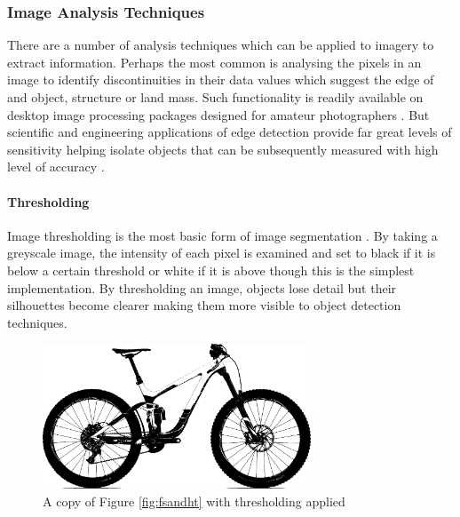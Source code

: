 \subsubsection{Image Analysis Techniques}
	There are a number of analysis techniques which can be applied to imagery to extract information. Perhaps the most common is analysing the pixels in an image to identify discontinuities in their data values which suggest the edge of and object, structure or land mass. Such functionality is readily available on desktop image processing packages designed for amateur photographers \citep{photoshop}. But scientific and engineering applications of edge detection provide far great levels of sensitivity helping isolate objects that can be subsequently measured with high level of accuracy \citep{matlabedge}.
	\paragraph{Thresholding}
		Image thresholding is the most basic form of image segmentation \citep{haralock1991computer}. By taking a greyscale image, the intensity of each pixel is examined and set to black if it is below a certain threshold or white if it is above though this is the simplest implementation. By thresholding an image, objects lose detail but their silhouettes become clearer making them more visible to object detection techniques.
		\begin{figure}[h!]
			\centering
			\includegraphics[width=8cm]{../images/reign_threshold.jpg}
			\caption{A copy of Figure \ref{fig:fsandht} with thresholding applied}
		\end{figure}
